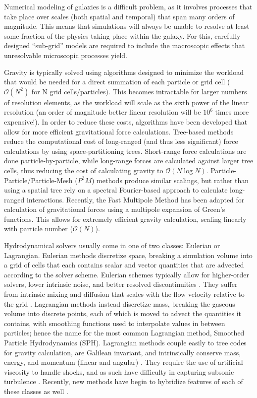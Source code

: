 Numerical modeling of galaxies is a difficult problem, as it involves processes
that take place over scales (both spatial and temporal) that span many orders of
magnitude.  This means that simulations will always be unable to resolve at
least some fraction of the physics taking place within the galaxy.  For this,
carefully designed ``sub-grid'' models are required to include the macroscopic
effects that unresolvable microscopic processes yield. 

Gravity is typically solved using algorithms designed to minimize the workload
that would be needed for a direct summation of each particle or grid cell
($\mathcal{O}(N^2)$ for N grid cells/particles).  This becomes intractable for
larger numbers of resolution elements, as the workload will scale as the sixth
power of the linear resolution (an order of magnitude better linear resolution
will be $10^6$ times more expensive!).  In order to reduce these costs,
algorithms have been developed that allow for more efficient gravitational
force calculations.  Tree-based methods \citep{Barnes1986} reduce the
computational cost of long-ranged (and thus less significant) force
calculations by using space-partitioning trees.  Short-range force calculations
are done particle-by-particle, while long-range forces are calculated against
larger tree cells, thus reducing the cost of calculating gravity to
$\mathcal{O}(N\log N)$.  Particle-Particle/Particle-Mesh ($P^3M$) methods
\citep{Couchman1991} produce similar scalings, but rather than using a
spatial tree rely on a spectral Fourier-based approach to calculate long-ranged
interactions.  Recently, the Fast Multipole Method \citep{Greengard1987} has
been adapted for calculation of gravitational forces
\citep{Dehnen2002,Hahn2013} using a multipole expansion of Green's functions.
This allows for extremely efficient gravity calculation, scaling linearly with
particle number ($\mathcal{O}(N)$).

Hydrodynamical solvers usually come in one of two classes: Eulerian or
Lagrangian.  Eulerian methods discretize space, breaking a simulation volume
into a grid of cells that each contains scalar and vector quantities that are
advected according to the solver scheme.  Eulerian schemes typically allow for
higher-order solvers, lower intrinsic noise, and better resolved discontinuities
\citep{Teyssier2002,Stone2008,Bryan2014}.  They suffer from intrinsic mixing and
diffusion that scales with the flow velocity relative to the grid
\citep{Agertz2007,Tasker2008}.  Lagrangian methods instead discretize mass,
breaking the gaseous volume into discrete points, each of which is moved to
advect the quantities it contains, with smoothing functions used to interpolate
values in between particles; hence the name for the most common Lagrangian
method, Smoothed Particle Hydrodynamics (SPH).  Lagrangian methods couple easily
to tree codes for gravity calculation, are Galilean invariant, and intrinsically
conserve mass, energy, and momentum (linear and angular)
\citep{Katz1996,Wadsley2004,Springel2005}.  They require the use of artificial
viscosity to handle shocks, and as such have difficulty in capturing subsonic
turbulence \citep{Bauer2012}. Recently, new methods have begin to hybridize
features of each of these classes as well \citep{Springel2010,Hopkins2015}. 

